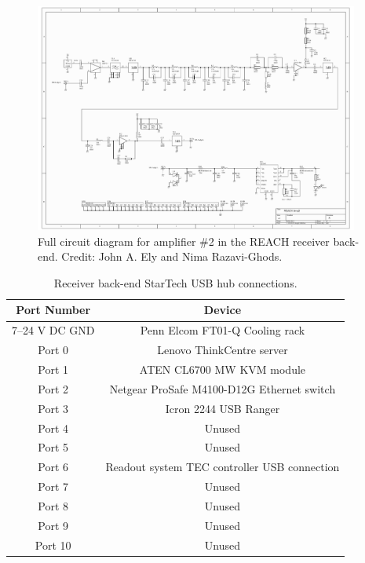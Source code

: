 \begin{figure}
    \centering
    \includegraphics[angle=90,width=0.95\textwidth]{amp2_schematic}
    \caption{Full circuit diagram for amplifier \#2 in the REACH receiver back-end. Credit: John A. Ely and Nima Razavi-Ghods.}
    \label{fig:amp2_schematic}
\end{figure}

\begin{table}
    \begin{center}
    \begin{tabular}{ |c|c| }
    \hline
    Port Number & Device \\
    \hline
    7--24 V DC GND & Penn Elcom FT01-Q Cooling rack\\
    Port 0 & Lenovo ThinkCentre server \\
    Port 1 & ATEN CL6700 MW KVM module \\
    Port 2 & Netgear ProSafe M4100-D12G Ethernet switch \\
    Port 3 & Icron 2244 USB Ranger \\
    Port 4 & Unused \\
    Port 5 & Unused \\
    Port 6 & Readout system TEC controller USB connection \\
    Port 7 & Unused \\
    Port 8 & Unused \\
    Port 9 & Unused \\
    Port 10 & Unused \\
    \hline
    \end{tabular}
    \caption{Receiver back-end StarTech USB hub connections.}
    \label{tab:usb_hub}
    \end{center}
\end{table}


